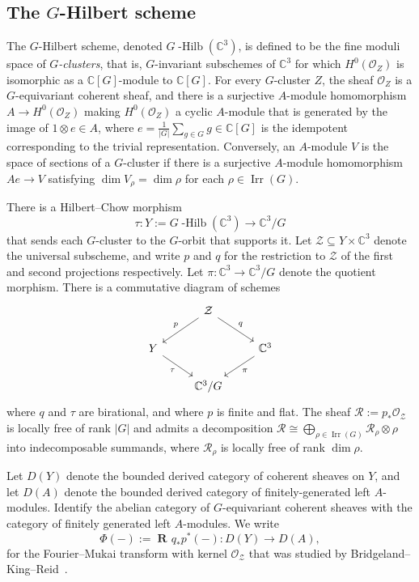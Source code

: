 \documentclass[11pt,reqno]{amsart}
\numberwithin{equation}{section}
\theoremstyle{definition}
\newcommand{\CC}{\ensuremath{\mathbb{C}}}
\newcommand{\ghilb}{\ensuremath{G}\operatorname{-Hilb}}
\newcommand{\0}{\operatorname{0}}
\newcommand{\Irr}{\operatorname{Irr}}
\DeclareMathOperator{\Rderived}{\mathbf{R}\!}
\begin{document}
 \subsection{The $G$-Hilbert scheme}
   The $G$-Hilbert scheme, denoted $\ghilb(\CC^3)$, is defined to be the fine moduli space of \emph{$G$-clusters}, that is, $G$-invariant subschemes of $\CC^3$ for which $H^0(\mathcal{O}_Z)$ is isomorphic as a $\CC[G]$-module to $\CC[G]$. For every $G$-cluster $Z$, the sheaf $\mathcal{O}_Z$ is a $G$-equivariant coherent sheaf, and there is a surjective $A$-module homomorphism $A \to H^0(\mathcal{O}_Z)$ making $H^0(\mathcal{O}_Z)$ a cyclic $A$-module that is generated by the image of $1\otimes e\in A$, where $e=\frac{1}{\vert G\vert} \sum_{g\in G} g\in \CC[G]$ is the idempotent corresponding to the trivial representation. Conversely,  an $A$-module $V$ is the space of sections of a $G$-cluster if there is a surjective $A$-module homomorphism $Ae \to V$ satisfying $\dim V_\rho=\dim\rho$ for each $\rho\in \Irr(G)$.

   There is a Hilbert--Chow morphism 
  \[
  \tau\colon Y:= \ghilb(\mathbb{C}^3)\longrightarrow \mathbb{C}^3/G
  \]
  that sends each $G$-cluster to the $G$-orbit that supports it. Let $\mathcal{Z}\subseteq Y\times \CC^3$ denote the universal subscheme, and write $p$ and $q$ for the restriction to $\mathcal{Z}$ of the first and second projections respectively. Let $\pi\colon \CC^3\to \CC^3/G$ denote the quotient morphism.  There is a commutative diagram of schemes
      \begin{equation}
 \label{eqn:BKRdiagram}
\begin{tikzcd}
  & \mathcal{Z}\ar[dl,swap,"p"] \ar[dr,"q"]& \\
Y\ar[dr,swap,"\tau"] & & \CC^3\ar[dl,"\pi"] \\
  & \mathbb{C}^3/G & 
  \end{tikzcd}
  \end{equation}
  where $q$ and $\tau$ are birational, and where $p$ is finite and flat. The sheaf $\mathcal{R}:=p_*\mathcal{O}_{\mathcal{Z}}$ is locally free of rank $|G|$ and admits a decomposition $\mathcal{R}\cong\bigoplus_{\rho\in \Irr(G)} \mathcal{R}_\rho\otimes \rho$ into indecomposable summands,
   where $\mathcal{R}_\rho$ is locally free of rank $\dim \rho$. 
   
 Let $D(Y)$ denote the bounded derived category of coherent sheaves on $Y$, and let $D(A)$ denote the bounded derived category of finitely-generated left $A$-modules. Identify the abelian category of $G$-equivariant coherent sheaves with the category of finitely generated left $A$-modules. We write
 \begin{equation}
  \label{eqn:BKR}
 \Phi(-):=\Rderived q_*p^*(-)\colon D(Y)\longrightarrow D(A),
   \end{equation}
 for the Fourier--Mukai transform with kernel $\mathcal{O}_{\mathcal{Z}}$ that was studied by Bridgeland--King--Reid~\cite{BKR01}.
    
\end{document}
